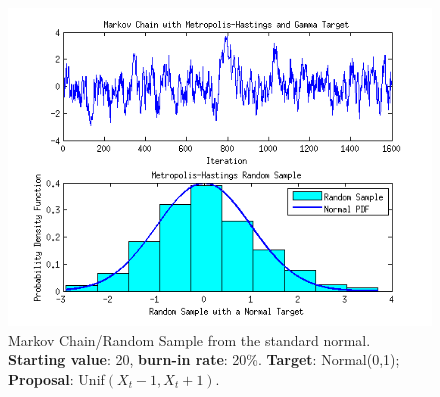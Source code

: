 \documentclass[12pt,a4paper]{article}
\begin{document}
\begin{figure}[ht!] 
\begin{center}
\includegraphics[scale=.95]{graph6.png}
\caption{Markov Chain/Random Sample from the standard normal. \textbf{Starting value}: 20, \textbf{burn-in rate}: 20\%. \textbf{Target}: Normal(0,1); \textbf{Proposal}: Unif$(X_t-1,X_t+1)$.}
\label{q4fig2}
\end{center}
\end{figure}
\FloatBarrier
\clearpage
\end{document}
